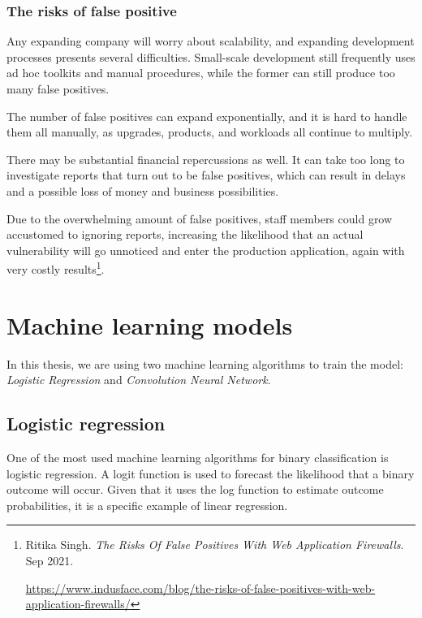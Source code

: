 \subsubsection{The risks of false positive} 
\hspace{0.5cm}Any expanding company will worry about scalability, and expanding development processes presents several difficulties. Small-scale development still frequently uses ad hoc toolkits and manual procedures, while the former can still produce too many false positives.

The number of false positives can expand exponentially, and it is hard to handle them all manually, as upgrades, products, and workloads all continue to multiply.

There may be substantial financial repercussions as well. It can take too long to investigate reports that turn out to be false positives, which can result in delays and a possible loss of money and business possibilities.

Due to the overwhelming amount of false positives, staff members could grow accustomed to ignoring reports, increasing the likelihood that an actual vulnerability will go unnoticed and enter the production application, again with very costly results\footnote{Ritika Singh. \textit{The Risks Of False Positives With Web Application Firewalls}. Sep 2021. \raggedright\url{https://www.indusface.com/blog/the-risks-of-false-positives-with-web-application-firewalls/}}.

\newpage
\section{Machine learning models} 
\label{sec:machine_model}
\hspace{0.5cm}In this thesis, we are using two machine learning algorithms to train the model: \textit{Logistic Regression} and \textit{Convolution Neural Network}.
\subsection{Logistic regression}
\label{subsec:logistic_regression}
\hspace{0.5cm}One of the most used machine learning algorithms for binary classification is logistic regression. A logit function is used to forecast the likelihood that a binary outcome will occur. Given that it uses the log function to estimate outcome probabilities, it is a specific example of linear regression.

